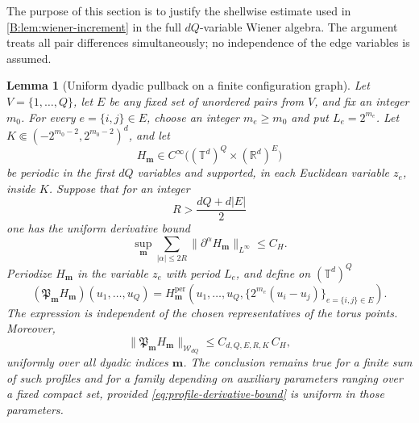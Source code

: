 \documentclass[11pt]{article}
\newtheorem{lemma}[lemma]{Lemma}
\newcommand{\R}{\mathbb{R}}
\newcommand{\Torus}{\mathbb{T}}
\newcommand{\cW}{\mathcal{W}}
\newcommand{\norm}[1]{\lVert #1\rVert}
\newcommand{\abs}[1]{\lvert #1\rvert}
\begin{document}
The purpose of this section is to justify the shellwise estimate used in
\cref{B:lem:wiener-increment} in the full \(dQ\)-variable Wiener algebra.  The
argument treats all pair differences simultaneously; no independence of the
edge variables is assumed.

\begin{lemma}[Uniform dyadic pullback on a finite configuration graph]
\label{lem:configuration-pullback}
Let \(V=\{1,\ldots,Q\}\), let \(E\) be any fixed set of unordered pairs from
\(V\), and fix an integer \(m_0\).  For every \(e=\{i,j\}\in E\), choose an
integer \(m_e\ge m_0\) and put \(L_e=2^{m_e}\).  Let
\(K\Subset(-2^{m_0-2},2^{m_0-2})^d\), and let
\[
 H_{\bm m}\in C^\infty\bigl((\Torus^d)^Q\times(\R^d)^E\bigr)
\]
be periodic in the first \(dQ\) variables and supported, in each Euclidean
variable \(z_e\), inside \(K\).  Suppose that for an integer
\[
 R>\frac{dQ+d\abs E}{2}
\]
one has the uniform derivative bound
\begin{equation}
 \sup_{\bm m}
 \sum_{\abs\alpha\le2R}
 \norm{\partial^\alpha H_{\bm m}}_{L^\infty}
 \le C_H.
 \label{eq:profile-derivative-bound}
\end{equation}
Periodize \(H_{\bm m}\) in the variable \(z_e\) with period \(L_e\), and
define on \((\Torus^d)^Q\)
\begin{equation}
 (\mathfrak P_{\bm m}H_{\bm m})(u_1,\ldots,u_Q)
 =H_{\bm m}^{\mathrm{per}}
 \left(u_1,\ldots,u_Q,
       \{2^{m_e}(u_i-u_j)\}_{e=\{i,j\}\in E}
 \right).
 \label{eq:dyadic-pullback}
\end{equation}
The expression is independent of the chosen representatives of the torus
points.  Moreover,
\begin{equation}
 \norm{\mathfrak P_{\bm m}H_{\bm m}}_{\cW_{dQ}}
 \le C_{d,Q,E,R,K}\,C_H,
 \label{eq:dyadic-pullback-bound}
\end{equation}
uniformly over all dyadic indices \(\bm m\).  The conclusion remains true
for a finite sum of such profiles and for a family depending on auxiliary
parameters ranging over a fixed compact set, provided
\eqref{eq:profile-derivative-bound} is uniform in those parameters.
\end{lemma}
\end{document}
